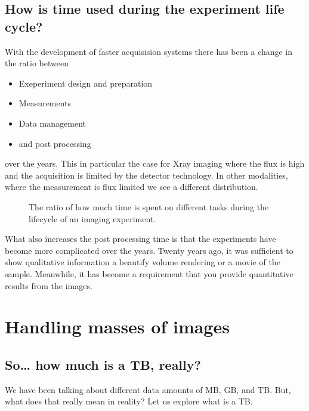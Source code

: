 \documentclass[letterpaper,10pt,english]{sphinxmanual}
\begin{document}
\subsection{How is time used during the experiment life cycle?}
\label{\detokenize{01-Introduction:how-is-time-used-during-the-experiment-life-cycle}}
\sphinxAtStartPar
With the development of faster acquisision systems there has been a change in the ratio between
\begin{itemize}
\item {} 
\sphinxAtStartPar
Exeperiment design and preparation

\item {} 
\sphinxAtStartPar
Measurements

\item {} 
\sphinxAtStartPar
Data management

\item {} 
\sphinxAtStartPar
and post processing

\end{itemize}

\sphinxAtStartPar
over the years. This in particular the case for X\sphinxhyphen{}ray imaging where the flux is high and the acquisition is limited by the detector technology. In other modalities, where the measurement is flux limited we see a different distribution.

\begin{figure}[htbp]
\centering
\capstart

\noindent{}
\caption{The ratio of how much time is spent on different tasks during the lifecycle of an imaging experiment.}\label{\detokenize{01-Introduction:id10}}\end{figure}

\sphinxAtStartPar
What also increases the post processing time is that the experiments have become more complicated over the years. Twenty years ago, it was sufficient to show qualitative information a beautify volume rendering or a movie of the sample. Meanwhile, it has become a requirement that you provide quantitative results from the images.




\section{Handling masses of images}
\label{\detokenize{01-Introduction:handling-masses-of-images}}

\subsection{So… how much is a TB, really?}
\label{\detokenize{01-Introduction:so-how-much-is-a-tb-really}}
\sphinxAtStartPar
We have been talking about different data amounts of MB, GB, and TB. But, what does that really mean in reality? Let us explore what is a TB.
\end{document}
